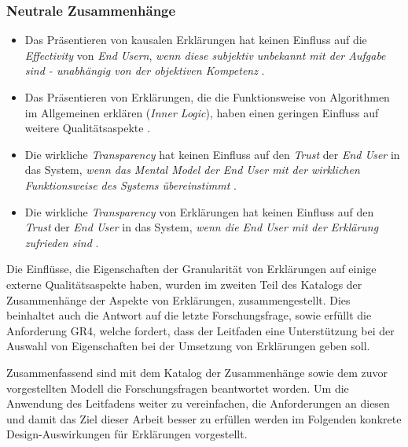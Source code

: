 \subsubsection*{Neutrale Zusammenhänge}

\begin{itemize}
    \item Das Präsentieren von kausalen Erklärungen hat keinen Einfluss auf die \textit{Effectivity} von \textit{End Usern}, \textit{wenn diese subjektiv unbekannt mit der Aufgabe sind - unabhängig von der objektiven Kompetenz} \cite{schaffer_i_2019}.
    \item Das Präsentieren von Erklärungen, die die Funktionsweise von Algorithmen im Allgemeinen erklären (\textit{Inner Logic}), haben einen geringen Einfluss auf weitere Qualitätsaspekte \cite{chazette_end-users_nodate}.
    \item Die wirkliche \textit{Transparency} hat keinen Einfluss auf den \textit{Trust} der \textit{End User} in das System, \textit{wenn das Mental Model der End User mit der wirklichen Funktionsweise des Systems übereinstimmt} \cite{eiband_impact_2019, riveiro_thats_2021}.
    \item Die wirkliche \textit{Transparency} von Erklärungen hat keinen Einfluss auf den \textit{Trust} der \textit{End User} in das System, \textit{wenn die End User mit der Erklärung zufrieden sind} \cite{eiband_impact_2019, riveiro_thats_2021}.
\end{itemize}

\smallskip

\noindent{}

\smallskip

Die Einflüsse, die Eigenschaften der Granularität von Erklärungen auf einige externe Qualitätsaspekte haben, wurden im zweiten Teil des Katalogs der Zusammenhänge der Aspekte von Erklärungen, zusammengestellt. Dies beinhaltet auch die Antwort auf die letzte Forschungsfrage, sowie erfüllt die Anforderung GR4, welche fordert, dass der Leitfaden eine Unterstützung bei der Auswahl von Eigenschaften bei der Umsetzung von Erklärungen geben soll.

\smallskip

Zusammenfassend sind mit dem Katalog der Zusammenhänge sowie dem zuvor vorgestellten Modell die Forschungsfragen beantwortet worden. Um die Anwendung des Leitfadens weiter zu vereinfachen, die Anforderungen an diesen und damit das Ziel dieser Arbeit besser zu erfüllen werden im Folgenden konkrete Design-Auswirkungen für Erklärungen vorgestellt.

